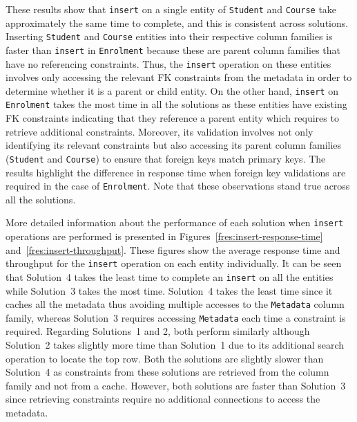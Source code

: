 These results show that \texttt{insert} on a single entity of \texttt{Student}
and \texttt{Course} take approximately the same time to complete, and this is
consistent across solutions.  Inserting \texttt{Student} and \texttt{Course}
entities into their respective column families is faster than \texttt{insert} in
\texttt{Enrolment} because these are parent column families that have no
referencing constraints. Thus, the \texttt{insert} operation on these entities
involves only accessing the relevant \ac{FK} constraints from the metadata in
order to determine whether it is a parent or child entity.
On the other hand,  \texttt{insert} on  \texttt{Enrolment}  takes the most time
in all the solutions as these entities have existing \ac{FK} constraints
indicating that they reference a parent entity which requires to retrieve
additional constraints. Moreover, its validation involves not only identifying
its relevant constraints but also accessing its parent column families
(\texttt{Student} and \texttt{Course}) to ensure that foreign keys match primary
keys. The results highlight the difference in response time when
foreign key validations are required in the case of \texttt{Enrolment}.
Note that these observations stand true across all the solutions.

More detailed information about the performance of each solution when
\texttt{insert} operations are performed is presented in
Figures~\ref{fres:insert-response-time} and~\ref{fres:insert-throughput}.
These figures show the average response time and throughput for the
\texttt{insert} operation on  each entity individually.
It can be seen that Solution~4 takes the least time to complete an 
\texttt{insert} on all the entities while Solution~3 takes the most time. 
Solution~4 takes the least time since it caches all the metadata thus avoiding 
multiple accesses to the \texttt{Metadata} column family, whereas Solution~3 
requires accessing \texttt{Metadata} each time a constraint is required. 
Regarding Solutions~1 and 2,  both perform similarly although Solution~2 takes 
slightly  more time than Solution~1 due to its additional search operation to 
locate the top row. Both the solutions are slightly slower than Solution~4 as 
constraints from these solutions are retrieved from the column family and  not 
from a cache. However, both solutions are faster than Solution~3 since 
retrieving constraints require no additional connections to access the metadata.




